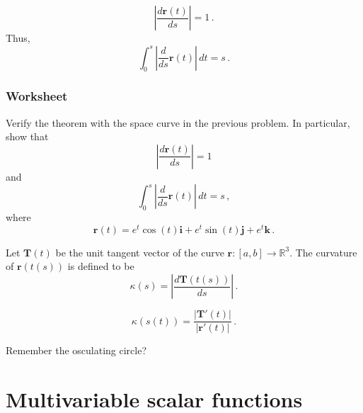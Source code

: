 \documentclass[aspectratio=169,handout]{beamer}
\newcommand{\vect}{\mathbf}
\newcommand{\R}{\mathbb{R}}
\begin{document}
\begin{frame}
    \begin{theorem}
        $$\left| \frac{d \vect{r}(t)}{ds} \right| = 1 \,.$$
Thus,
$$\int_0^s \left| \frac{d}{ds} \vect{r}(t) \right| \, dt = s \,.$$
    \end{theorem}
\end{frame}

\begin{frame}
    \frametitle{Worksheet}
    Verify the theorem with the space curve in the previous problem.
    In particular, show that
        $$\left| \frac{d \vect{r}(t)}{ds} \right| = 1 $$
        and
$$\int_0^s \left| \frac{d}{ds} \vect{r}(t) \right| \, dt = s \,,$$
where
    \begin{equation*}
        \vect{r}(t) = e^t \cos(t) \vect{i} + e^t \sin(t) \vect{j} + e^t \vect{k} \,.
    \end{equation*}
\end{frame}


\begin{frame}
    \begin{definition}
    Let $\vect{T}(t)$ be the unit tangent vector of the curve $\vect{r}:[a,b] \to \R^3$.
    The curvature of $\vect{r}(t(s))$ is defined to be
    \begin{equation*}
        \kappa(s) = \left| \frac{ d \vect{T}(t(s))}{ds} \right| \,.
    \end{equation*}
    \end{definition}

    \pause

    \begin{theorem}
\begin{equation*}
    \kappa(s(t)) =  \frac{|\vect{T}'(t)|}{|\vect{r}'(t)|}   \,.
\end{equation*}
    \end{theorem}
    
    \pause

    Remember the osculating circle?
\end{frame}

\section{Multivariable scalar functions}
\end{document}
